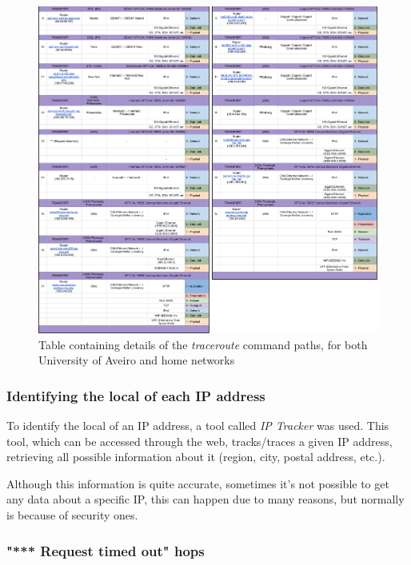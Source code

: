 \documentclass{article}
\newcommand\tab[1][1cm]{\hspace*{#1}}
\begin{document}
\vspace*{\fill}
    \begin{figure}
        \includegraphics[width=1 \textwidth]{images/traceroute_part2.png}
        \caption{Table containing details of the \textit{traceroute} command paths, for both University of Aveiro and home networks}
    \end{figure}
\vspace*{\fill}

\subsubsection{Identifying the local of each IP address}

\tab To identify the local of an IP address, a tool called \textit{IP Tracker} was used. This tool, which can be accessed through the web, tracks/traces a given IP address, retrieving all possible information about it (region, city, postal address, etc.).

Although this information is quite accurate, sometimes it's not possible to get any data about a specific IP, this can happen due to many reasons, but normally is because of security ones.

\subsubsection{"*** Request timed out" hops}
\end{document}
